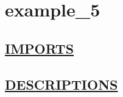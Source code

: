 \chapter*{example\_5}
\hypertarget{ecldoc:toc:example_5}{}

\section*{\underline{IMPORTS}}

\section*{\underline{DESCRIPTIONS}}
